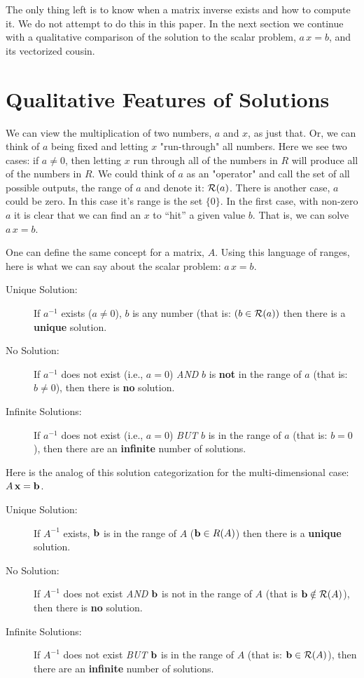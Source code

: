\documentclass{article}
\begin{document}
The only thing left is to know when a matrix inverse exists and how to compute it.
We do not attempt to do this in this paper. In the next section we continue with
a qualitative comparison of the solution to the scalar problem, $a\, x = b$, 
and its vectorized cousin.


\section{Qualitative Features of Solutions}
We can view the multiplication of two numbers, $a$ and $x$, as just that.
Or, we can think of $a$ being fixed and letting $x$ "run-through" all 
numbers. Here we see two cases: if $a \neq 0$, then letting $x$ run
through all of the numbers in $R$ will produce all of the numbers in $R$.
We could think of $a$ as an "operator" and call the set of all possible 
outputs, the range of $a$ and denote it: ${\cal R}(a)$.
There is another case, $a$ could be zero. In this case it's range is the
set $\{0\}$. In the first case, with non-zero $a$ it is clear that we can
find an $x$ to ``hit'' a given value $b$. That is, we can solve $a\, x = b$.

One can define the same concept for a matrix, $A$. Using this language
of ranges, here is what we can say about the scalar problem: $a \, x = b$.
\begin{description}
    \item[Unique Solution:]{If $a^{-1}$ exists ($a \neq 0$), $b$ is any number (that is: $(b \in {\cal R}(a))$}
		then there is a {\bf unique\/} solution.
\item[No Solution:]{If $a^{-1}$ does not exist (i.e., $a = 0$) {\em AND\/}
	$b$ is {\bf not\/} in the range of $a$ (that is: $b \ne 0$), then there is {\bf no\/} solution.}
\item[Infinite Solutions:]{If $a^{-1}$ does not exist (i.e., $a = 0$) {\em BUT\/}
	$b$ is in the range of $a$ (that is: $b = 0$), 
	then there are an {\bf infinite\/} number of solutions.}
\end{description}

Here is the analog of this solution categorization for the multi-dimensional case: $A \, {\bf x} = {\bf b}$.
\begin{description}
	\item[Unique Solution:]{If $A^{-1}$ exists, ${\bf b\/}$ is in the range of $A$ (${\bf b} \in R(A)$)
		then there is a {\bf unique\/} solution.}
\item[No Solution:]{If $A^{-1}$ does not exist {\em AND\/}
	${\bf b\/}$ is not in the range of $A$ (that is ${\bf b} \notin {\cal R}(A)$),
then there is {\bf no\/} solution.}  
\item[Infinite Solutions:]{If $A^{-1}$ does not exist {\em BUT\/}
		${\bf b\/}$ is in the range of $A$ (that is: ${\bf b} \in {\cal R}(A)$),
then there are an {\bf infinite\/} number of solutions.} 
\end{description}
\end{document}
